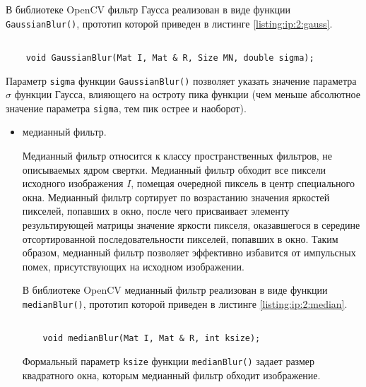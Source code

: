 \begin{itemize}
	В библиотеке OpenCV фильтр Гаусса реализован в виде функции \verb|GaussianBlur()|, прототип которой приведен в листинге \ref{listing:ip:2:gauss}.
	\begin{lstlisting}

	void GaussianBlur(Mat I, Mat & R, Size MN, double sigma);

	\end{lstlisting}
	\mylistingend

	Параметр \verb|sigma| функции \verb|GaussianBlur()| позволяет указать значение параметра $\sigma$ функции Гаусса, влияющего на остроту пика функции (чем меньше абсолютное значение параметра \verb|sigma|, тем пик острее и наоборот).

\end{itemize}

\def\sgm{1.5}

\mimagebegin{ip:2:gauss}{Двухмерная функция Гаусса ($\sigma = $ \sgm)}
\noindent
{}
\mimageend
	
\begin{itemize}

	\item медианный фильтр.
	
	Медианный фильтр относится к классу пространственных фильтров, не описываемых ядром свертки. Медианный фильтр обходит все пиксели исходного изображения $I$, помещая очередной пиксель в центр специального окна. Медианный фильтр сортирует по возрастанию значения яркостей пикселей, попавших в окно, после чего присваивает элементу результирующей матрицы значение яркости пикселя, оказавшегося в середине отсортированной последовательности пикселей, попавших в окно. Таким образом, медианный фильтр позволяет эффективно избавится от импульсных помех, присутствующих на исходном изображении.

	В библиотеке OpenCV медианный фильтр реализован в виде функции \verb|medianBlur()|, прототип которой приведен в листинге \ref{listing:ip:2:median}.

	\begin{lstlisting}

	void medianBlur(Mat I, Mat & R, int ksize);

	\end{lstlisting}
	\mylistingend

	Формальный параметр \verb|ksize| функции \verb|medianBlur()| задает размер квадратного окна, которым медианный фильтр обходит изображение.

\end{itemize}

